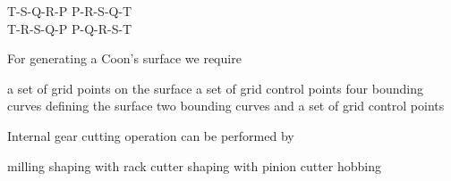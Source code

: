 \documentclass[addpoints,10pt]{exam}
\begin{document}
\begin{questions}
    \begin{oneparchoices}
        \choice T-S-Q-R-P
        \choice P-R-S-Q-T\\
        \choice T-R-S-Q-P
        \choice P-Q-R-S-T
    \end{oneparchoices}

    \pagebreak

    \question For generating a Coon's surface we require
    \begin{choices}
        \choice a set of grid points on the surface
        \choice a set of grid control points
        \choice four bounding curves defining the surface
        \choice two bounding curves and a set of grid control points
    \end{choices}

    \question Internal gear cutting operation can be performed by
    \begin{choices}
        \choice milling
        \choice shaping with rack cutter
        \choice shaping with pinion cutter
        \choice hobbing
    \end{choices}

\end{questions}
\end{document}
